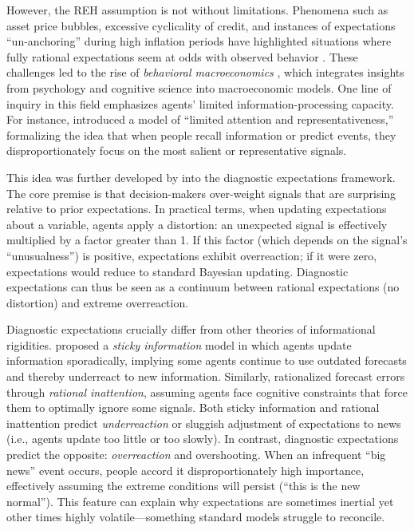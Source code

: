 \documentclass[12pt]{article}
\begin{document}
However, the REH assumption is not without limitations. Phenomena such as asset price bubbles, excessive cyclicality of credit, and instances of expectations “un-anchoring” during high inflation periods have highlighted situations where fully rational expectations seem at odds with observed behavior \cite{Shiller2000}. These challenges led to the rise of \textit{behavioral macroeconomics} \cite{Akerlof2009}, which integrates insights from psychology and cognitive science into macroeconomic models. One line of inquiry in this field emphasizes agents' limited information-processing capacity. For instance, \cite{Gennaioli2010} introduced a model of “limited attention and representativeness,” formalizing the idea that when people recall information or predict events, they disproportionately focus on the most salient or representative signals.

This idea was further developed by \cite{Bordalo2018} into the diagnostic expectations framework. The core premise is that decision-makers over-weight signals that are surprising relative to prior expectations. In practical terms, when updating expectations about a variable, agents apply a distortion: an unexpected signal is effectively multiplied by a factor greater than 1. If this factor (which depends on the signal's “unusualness”) is positive, expectations exhibit overreaction; if it were zero, expectations would reduce to standard Bayesian updating. Diagnostic expectations can thus be seen as a continuum between rational expectations (no distortion) and extreme overreaction.

Diagnostic expectations crucially differ from other theories of informational rigidities. \cite{Mankiw2002} proposed a \textit{sticky information} model in which agents update information sporadically, implying some agents continue to use outdated forecasts and thereby underreact to new information. Similarly, \cite{Sims2003} rationalized forecast errors through \textit{rational inattention}, assuming agents face cognitive constraints that force them to optimally ignore some signals. Both sticky information and rational inattention predict \textit{underreaction} or sluggish adjustment of expectations to news (i.e., agents update too little or too slowly). In contrast, diagnostic expectations predict the opposite: \textit{overreaction} and overshooting. When an infrequent “big news” event occurs, people accord it disproportionately high importance, effectively assuming the extreme conditions will persist (“this is the new normal”). This feature can explain why expectations are sometimes inertial yet other times highly volatile—something standard models struggle to reconcile.
\end{document}
